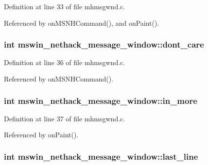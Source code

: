 Definition at line 33 of file mhmsgwnd.\+c.



Referenced by on\+M\+S\+N\+H\+Command(), and on\+Paint().

\hypertarget{structmswin__nethack__message__window_a2a4528b8e453d2d46e33c1d6262c64c5}{
\subsubsection[{dont\+\_\+care}]{\setlength{\rightskip}{0pt plus 5cm}int mswin\+\_\+nethack\+\_\+message\+\_\+window\+::dont\+\_\+care}}\label{structmswin__nethack__message__window_a2a4528b8e453d2d46e33c1d6262c64c5}


Definition at line 36 of file mhmsgwnd.\+c.



Referenced by on\+M\+S\+N\+H\+Command().

\hypertarget{structmswin__nethack__message__window_a9b3ed726a4e021a2b7532e4f4af2dfe5}{
\subsubsection[{in\+\_\+more}]{\setlength{\rightskip}{0pt plus 5cm}int mswin\+\_\+nethack\+\_\+message\+\_\+window\+::in\+\_\+more}}\label{structmswin__nethack__message__window_a9b3ed726a4e021a2b7532e4f4af2dfe5}


Definition at line 37 of file mhmsgwnd.\+c.



Referenced by on\+Paint().

\hypertarget{structmswin__nethack__message__window_ae7ecc61ab8572e72f04323746402282f}{
\subsubsection[{last\+\_\+line}]{\setlength{\rightskip}{0pt plus 5cm}int mswin\+\_\+nethack\+\_\+message\+\_\+window\+::last\+\_\+line}}\label{structmswin__nethack__message__window_ae7ecc61ab8572e72f04323746402282f}


